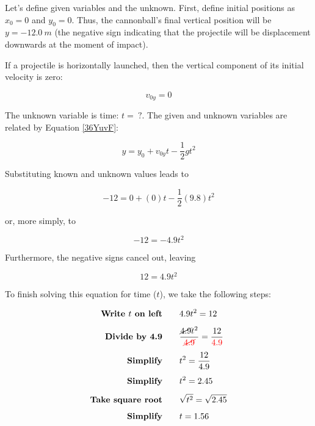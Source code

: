 \documentclass[main-physics.tex]{subfiles}
\begin{document}
Let's define given variables and the unknown. First, define initial positions as $x_0 = 0$ and $y_0 = 0$. Thus, the cannonball's final vertical position will be $y = -\SI{12.0}{m}$ (the negative sign indicating that the projectile will be displacement downwards at the moment of impact).

\vspace{1em}

If a projectile is horizontally launched, then the vertical component of its initial velocity is zero:

\begin{equation*}
    v_{0y} = 0
\end{equation*}

The unknown variable is time: $t =\ ?$. The given and unknown variables are related by Equation \eqref{36YuvF}:

\begin{equation*}
    y = y_0 + v_{0y}t - \frac{1}{2}  g t^2 
\end{equation*}

Substituting known and unknown values leads to

\begin{equation*}
    -12 = 0 + (0) t - \frac{1}{2} (9.8) t^2
\end{equation*}

or, more simply, to

\begin{equation*}
    -12 = -4.9 t^2
\end{equation*}

Furthermore, the negative signs cancel out, leaving

\begin{equation*}
    12 = 4.9 t^2
\end{equation*}

To finish solving this equation for time ($t$), we take the following steps:

\begin{align*}
    \textbf{Write $t$ on left} \qquad & 4.9 t^2 = 12\\[1ex]
    \textbf{Divide by 4.9} \qquad & \frac{\cancel{4.9} t^2}{\textcolor{red}{\cancel{4.9}}} = \frac{12}{\textcolor{red}{4.9}}\\[1ex]
    \textbf{Simplify} \qquad & t^2 = \frac{12}{4.9}\\[1ex]
    \textbf{Simplify} \qquad & t^2 = 2.45\\[1ex]
    \textbf{Take square root} \qquad & \sqrt{t^2} = \sqrt{2.45}\\[1ex]
    \textbf{Simplify} \qquad & t = 1.56
\end{align*}
\end{document}
